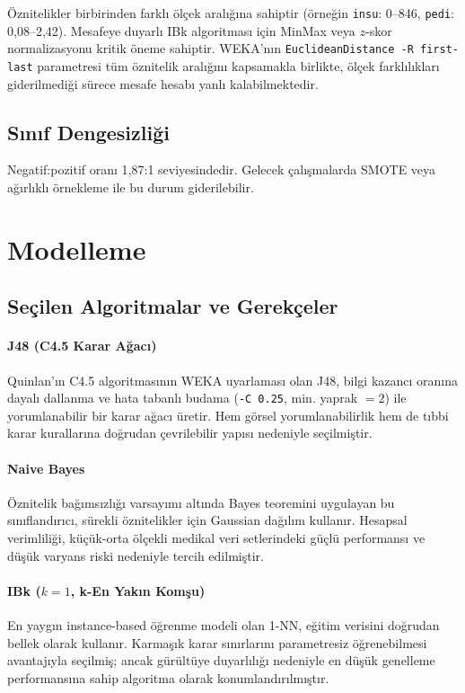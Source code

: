 \documentclass[12pt,a4paper]{article}
\begin{document}
Öznitelikler birbirinden farklı ölçek aralığına sahiptir
(örneğin \texttt{insu}: 0--846, \texttt{pedi}: 0{,}08--2{,}42).
Mesafeye duyarlı IBk algoritması için MinMax veya $z$-skor normalizasyonu
kritik öneme sahiptir. WEKA'nın \texttt{EuclideanDistance -R first-last}
parametresi tüm öznitelik aralığını kapsamakla birlikte, ölçek farklılıkları
giderilmediği sürece mesafe hesabı yanlı kalabilmektedir.

\subsection{Sınıf Dengesizliği}

Negatif:pozitif oranı 1{,}87:1 seviyesindedir. Gelecek çalışmalarda SMOTE
veya ağırlıklı örnekleme ile bu durum giderilebilir.

\section{Modelleme}

\subsection{Seçilen Algoritmalar ve Gerekçeler}

\paragraph{J48 (C4.5 Karar Ağacı)}
Quinlan'ın C4.5 algoritmasının WEKA uyarlaması olan J48, bilgi kazancı oranına
dayalı dallanma ve hata tabanlı budama (\texttt{-C~0.25}, min. yaprak $=2$) ile
yorumlanabilir bir karar ağacı üretir. Hem görsel yorumlanabilirlik hem de
tıbbi karar kurallarına doğrudan çevrilebilir yapısı nedeniyle seçilmiştir.

\paragraph{Naive Bayes}
Öznitelik bağımsızlığı varsayımı altında Bayes teoremini uygulayan bu
sınıflandırıcı, sürekli öznitelikler için Gaussian dağılım kullanır.
Hesapsal verimliliği, küçük-orta ölçekli medikal veri setlerindeki güçlü
performansı ve düşük varyans riski nedeniyle tercih edilmiştir.

\paragraph{IBk ($k{=}1$, k-En Yakın Komşu)}
En yaygın instance-based öğrenme modeli olan 1-NN, eğitim verisini doğrudan
bellek olarak kullanır. Karmaşık karar sınırlarını parametresiz öğrenebilmesi
avantajıyla seçilmiş; ancak gürültüye duyarlılığı nedeniyle en düşük
genelleme performansına sahip algoritma olarak konumlandırılmıştır.
\end{document}
